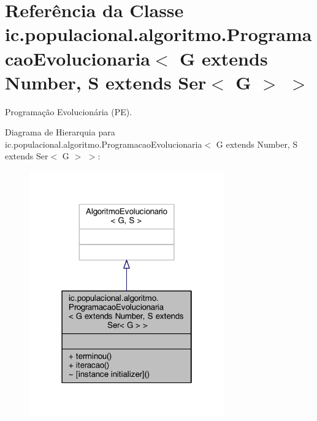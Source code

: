 \hypertarget{classic_1_1populacional_1_1algoritmo_1_1_programacao_evolucionaria_3_01_g_01extends_01_number_00132d0159107691234e2d806b9bd9cb38}{\section{Referência da Classe ic.\-populacional.\-algoritmo.\-Programacao\-Evolucionaria$<$ G extends Number, S extends Ser$<$ G $>$ $>$}
\label{classic_1_1populacional_1_1algoritmo_1_1_programacao_evolucionaria_3_01_g_01extends_01_number_00132d0159107691234e2d806b9bd9cb38}
}


Programação Evolucionária (P\-E).  




Diagrama de Hierarquia para ic.\-populacional.\-algoritmo.\-Programacao\-Evolucionaria$<$ G extends Number, S extends Ser$<$ G $>$ $>$\-:\nopagebreak
\begin{figure}[H]
\begin{center}
\leavevmode
\includegraphics[width=238pt]{classic_1_1populacional_1_1algoritmo_1_1_programacao_evolucionaria_3_01_g_01extends_01_number_00b88266a008efdc77276a7b1a5671275c}
\end{center}
\end{figure}


